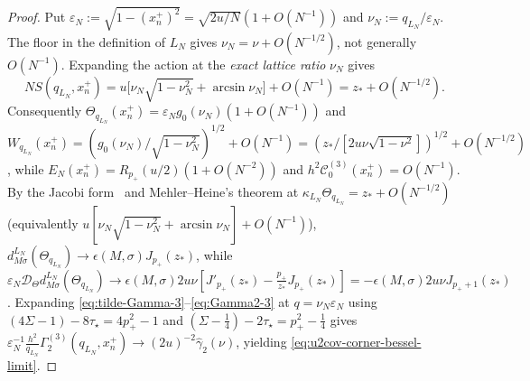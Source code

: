 \documentclass[11pt]{article}
\theoremstyle{definition}
\theoremstyle{remark}
\newcommand{\cD}{\mathcal{D}}
\newcommand{\cC}{\mathcal{C}}
\renewcommand{\_}{\oldunderscore\penalty0\hskip0pt\relax}
\begin{document}
\begin{proof}
Put $\varepsilon_N:=\sqrt{1-(x_n^+)^2}=\sqrt{2u/N}(1+O(N^{-1}))$ and $\nu_N:=q_{L_N}/\varepsilon_N$. The floor in the definition
  of $L_N$ gives $\nu_N=\nu+O(N^{-1/2})$, not generally $O(N^{-1})$. Expanding the action at the \emph{exact lattice ratio}
  $\nu_N$ gives
\begin{equation}
N S(q_{L_N},x_n^+)=u\bigl[\nu_N\sqrt{1-\nu_N^2}+\arcsin\nu_N\bigr]+O(N^{-1})
=z_*+O(N^{-1/2}).
\end{equation}
Consequently $\Theta_{q_{L_N}}(x_n^+)=\varepsilon_N g_0(\nu_N)(1+O(N^{-1}))$ and
$W_{q_{L_N}}(x_n^+)=(g_0(\nu_N)/\sqrt{1-\nu_N^2})^{1/2}+O(N^{-1})
=(z_*/[2u\nu\sqrt{1-\nu^2}])^{1/2}+O(N^{-1/2})$, while $E_N(x_n^+)=R_{p_+}(u/2)(1+O(N^{-2}))$ and
  $h^2\cC_0^{(3)}(x_n^+)=O(N^{-1})$. By the Jacobi form~\cite[Eq.~(68)]{LewisFixedRank} and Mehler--Heine's theorem at
  $\kappa_{L_N}\Theta_{q_{L_N}}=z_*+O(N^{-1/2})$ (equivalently $u[\nu_N\sqrt{1-\nu_N^2}+\arcsin\nu_N]+O(N^{-1})$),
  $d^{L_N}_{M\sigma}(\Theta_{q_{L_N}})\to\epsilon(M,\sigma)J_{p_+}(z_*)$, while $\varepsilon_N\cD_\Theta
  d^{L_N}_{M\sigma}(\Theta_{q_{L_N}})\to\epsilon(M,\sigma)2u\nu[J'_{p_+}(z_*)-\frac{p_+}{z_*}J_{p_+}(z_*)]=-\epsilon(M,\sigma)2u\nu
  J_{p_++1}(z_*)$. Expanding \eqref{eq:tilde-Gamma-3}--\eqref{eq:Gamma2-3} at $q=\nu_N\varepsilon_N$ using
  $(4\Sigma-1)-8\tau_\star=4p_+^2-1$ and $(\Sigma-\frac14)-2\tau_\star=p_+^2-\frac14$ gives
  $\varepsilon_N^{-1}\frac{h^2}{q_{L_N}}\Gamma_2^{(3)}(q_{L_N},x_n^+)\to(2u)^{-2}\widehat{\gamma}_2(\nu)$, yielding
  \eqref{eq:u2cov-corner-bessel-limit}.


\end{proof}
\end{document}
